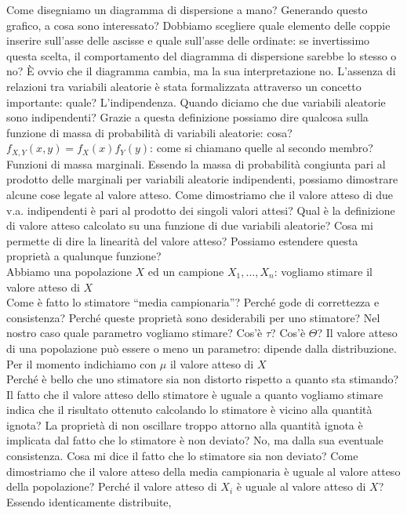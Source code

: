 \documentclass{article}
\begin{document}
    Come disegniamo un diagramma di dispersione a mano? Generando questo grafico, a cosa sono interessato? Dobbiamo scegliere quale elemento delle coppie inserire sull'asse
    delle ascisse e quale sull'asse delle ordinate: se invertissimo questa scelta, il comportamento del diagramma di dispersione sarebbe lo stesso o no? È ovvio che il
    diagramma cambia, ma la sua interpretazione no. L'assenza di relazioni tra variabili aleatorie è stata formalizzata attraverso un concetto importante: quale?
    L'indipendenza. Quando diciamo che
    due variabili aleatorie sono indipendenti? Grazie a questa definizione possiamo dire qualcosa sulla funzione di massa di probabilità di variabili aleatorie: cosa?
    $ f_{X, Y} (x, y) = f_X (x) f_Y (y) $: come si chiamano quelle al secondo membro? Funzioni di massa marginali. Essendo la massa di probabilità congiunta pari al prodotto
    delle marginali per variabili aleatorie indipendenti, possiamo dimostrare alcune cose legate al valore atteso. Come dimostriamo che il valore atteso di due v.a.
    indipendenti è pari al prodotto dei singoli valori attesi? Qual è la definizione di valore atteso calcolato su una funzione di due variabili aleatorie? Cosa mi permette di
    dire la linearità del valore atteso? Possiamo estendere questa proprietà a qualunque funzione? \\
    Abbiamo una popolazione $ X $ ed un campione $ X_1, \dots, X_n $: vogliamo stimare il valore atteso di $ X $ \\
    Come è fatto lo stimatore “media campionaria”? Perché gode di correttezza e consistenza? Perché queste proprietà sono desiderabili per uno stimatore? Nel nostro caso quale
    parametro vogliamo stimare? Cos'è $ \tau $? Cos'è $ \Theta $? Il valore atteso di una popolazione può essere o meno un parametro: dipende dalla distribuzione. Per il
    momento indichiamo con $ \mu $ il valore atteso di $ X $ \\
    Perché è bello che uno stimatore sia non distorto rispetto a quanto sta stimando? Il fatto che il valore atteso dello stimatore è uguale a quanto vogliamo stimare indica
    che il risultato ottenuto calcolando lo stimatore è vicino alla quantità ignota? La proprietà di non oscillare troppo attorno alla quantità ignota è implicata dal fatto
    che lo stimatore è non deviato? No, ma dalla sua eventuale consistenza. Cosa mi dice il fatto che lo stimatore sia non deviato? Come dimostriamo che il valore atteso della
    media campionaria è uguale al valore atteso della popolazione? Perché il valore atteso di $ X_i $ è uguale al valore atteso di $ X $? Essendo identicamente distribuite,
\end{document}
